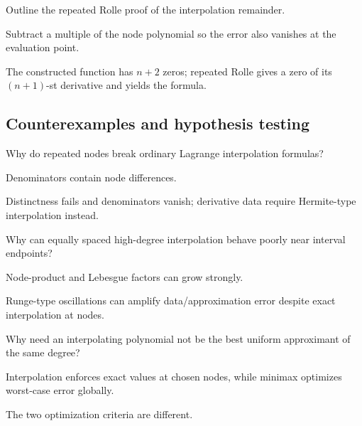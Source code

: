 \begin{exercise}\label{exr:ii20-expand-09}
Outline the repeated Rolle proof of the interpolation remainder.
\end{exercise}
\begin{hint}
Subtract a multiple of the node polynomial so the error also vanishes at the evaluation point.
\end{hint}
\begin{solution}
The constructed function has \(n+2\) zeros; repeated Rolle gives a zero of its \((n+1)\)-st derivative and yields the formula.
\end{solution}

\subsection*{Counterexamples and hypothesis testing}

\begin{exercise}\label{exr:ii20-expand-10}
Why do repeated nodes break ordinary Lagrange interpolation formulas?
\end{exercise}
\begin{hint}
Denominators contain node differences.
\end{hint}
\begin{solution}
Distinctness fails and denominators vanish; derivative data require Hermite-type interpolation instead.
\end{solution}

\begin{exercise}\label{exr:ii20-expand-11}
Why can equally spaced high-degree interpolation behave poorly near interval endpoints?
\end{exercise}
\begin{hint}
Node-product and Lebesgue factors can grow strongly.
\end{hint}
\begin{solution}
Runge-type oscillations can amplify data/approximation error despite exact interpolation at nodes.
\end{solution}

\begin{exercise}\label{exr:ii20-expand-12}
Why need an interpolating polynomial not be the best uniform approximant of the same degree?
\end{exercise}
\begin{hint}
Interpolation enforces exact values at chosen nodes, while minimax optimizes worst-case error globally.
\end{hint}
\begin{solution}
The two optimization criteria are different.
\end{solution}

